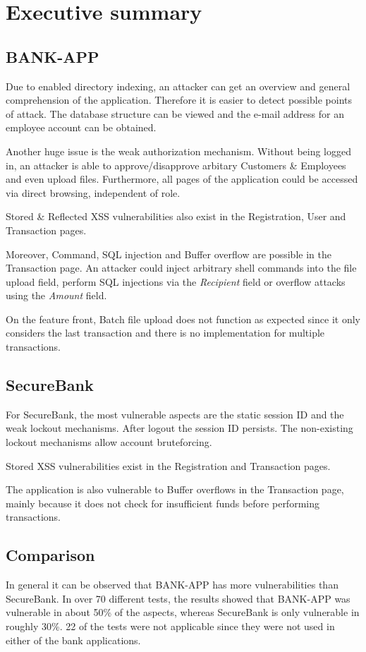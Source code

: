 \chapter{Executive summary}
\section*{BANK-APP}
Due to enabled directory indexing, an attacker can get an overview and general comprehension of the application. Therefore it is easier to detect possible points of attack. The database structure can be viewed and the e-mail address for an employee account can be obtained.

Another huge issue is the weak authorization mechanism. Without being logged in, an attacker is able to approve/disapprove arbitary Customers \& Employees and even upload files. Furthermore, all pages of the application could be accessed via direct browsing, independent of role.

Stored \& Reflected XSS vulnerabilities also exist in the Registration, User and Transaction pages.

Moreover, Command, SQL injection and Buffer overflow are possible in the Transaction page. An attacker could inject arbitrary shell commands into the file upload field, perform SQL injections via the \emph{Recipient} field or overflow attacks using the \emph{Amount} field.

On the feature front, Batch file upload does not function as expected since it only considers the last transaction and there is no implementation for multiple transactions.

\section*{SecureBank}
For SecureBank, the most vulnerable aspects are the static session ID and the weak lockout mechanisms. After logout the session ID persists. The non-existing lockout mechanisms allow account bruteforcing.

Stored XSS vulnerabilities exist in the Registration and Transaction pages.

The application is also vulnerable to Buffer overflows in the Transaction page, mainly because it does not check for insufficient funds before performing transactions.

\section*{Comparison}
In general it can be observed that BANK-APP has more vulnerabilities than SecureBank. In over 70 different tests, the results showed that BANK-APP was vulnerable in about 50\% of the aspects, whereas SecureBank is only vulnerable in roughly 30\%. 22 of the tests were not applicable since they were not used in either of the bank applications.